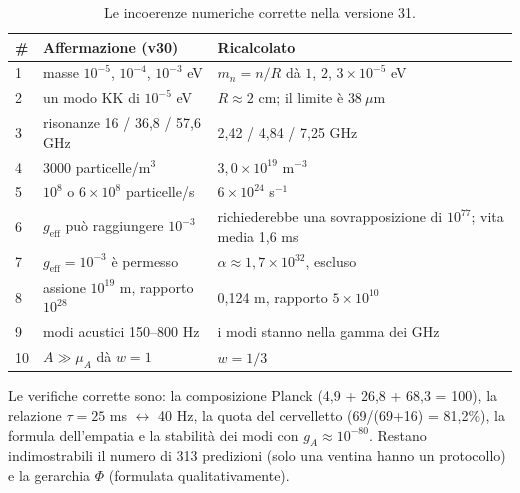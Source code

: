 \documentclass[11pt,a4paper]{article}
\begin{document}
\begin{table}[H]
\centering
\small
\begin{tabular}{@{}p{0.5cm}p{6.2cm}p{5.2cm}@{}}
\toprule
\# & \textbf{Affermazione (v30)} & \textbf{Ricalcolato} \\ \midrule
1 & masse $10^{-5}$, $10^{-4}$, $10^{-3}$ eV & $m_n = n/R$ dà $1$, $2$, $3 \times 10^{-5}$ eV \\
2 & un modo KK di $10^{-5}$ eV & $R \approx 2$ cm; il limite è $38\ \mu$m \\
3 & risonanze 16 / 36,8 / 57,6 GHz & 2,42 / 4,84 / 7,25 GHz \\
4 & 3000 particelle/m$^3$ & $3,0\times10^{19}$ m$^{-3}$ \\
5 & $10^8$ o $6\times10^8$ particelle/s & $6\times10^{24}$ s$^{-1}$ \\
6 & $g_{\text{eff}}$ può raggiungere $10^{-3}$ & richiederebbe una sovrapposizione di $10^{77}$; vita media 1,6 ms \\
7 & $g_{\text{eff}} = 10^{-3}$ è permesso & $\alpha \approx 1,7\times10^{32}$, escluso \\
8 & assione $10^{19}$ m, rapporto $10^{28}$ & 0,124 m, rapporto $5\times10^{10}$ \\
9 & modi acustici 150--800 Hz & i modi stanno nella gamma dei GHz \\
10 & $A \gg \mu_A$ dà $w = 1$ & $w = 1/3$ \\ \bottomrule
\end{tabular}
\caption{Le incoerenze numeriche corrette nella versione 31.}
\label{tab:audit}
\end{table}

Le verifiche corrette sono: la composizione Planck (4,9 + 26,8 + 68,3 = 100), la relazione $\tau = 25$ ms $\leftrightarrow$ 40 Hz, la quota del cervelletto (69/(69+16) = 81,2\%), la formula dell'empatia e la stabilità dei modi con $g_A \approx 10^{-80}$. Restano indimostrabili il numero di 313 predizioni (solo una ventina hanno un protocollo) e la gerarchia $\Phi$ (formulata qualitativamente).
\end{document}
